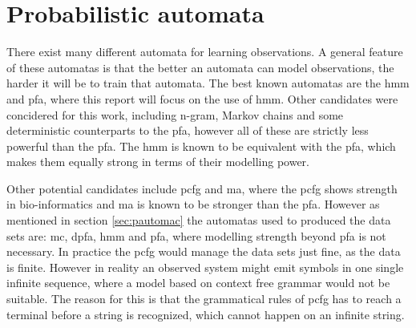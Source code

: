 \section{Probabilistic automata}
There exist many different automata for learning observations. A general feature of these automatas is that the better an automata can model observations, the harder it will be to train that automata. The best known automatas are the \gls{hmm} and \gls{pfa}, where this report will focus on the use of \gls{hmm}.\cite{pautomacTR}
Other candidates were concidered for this work, including n-gram, Markov chains and some deterministic counterparts to the \gls{pfa}, however all of these are strictly less powerful than the \gls{pfa}. The \gls{hmm} is known to be equivalent with the \gls{pfa}, which makes them equally strong in terms of their modelling power.

Other potential candidates include \gls{pcfg} and \gls{ma}, where the \gls{pcfg} shows strength in bio-informatics and \gls{ma} is known to be stronger than the \gls{pfa}. However as mentioned in section \ref{sec:pautomac} the automatas used to produced the data sets are: \gls{mc}, \gls{dpfa}, \gls{hmm} and \gls{pfa}, where modelling strength beyond \gls{pfa} is not necessary. In practice the \gls{pcfg} would manage the data sets just fine, as the data is finite. However in reality an observed system might emit symbols in one single infinite sequence, where a model based on context free grammar would not be suitable. The reason for this is that the grammatical rules of \gls{pcfg} has to reach a terminal before a string is recognized, which cannot happen on an infinite string.
